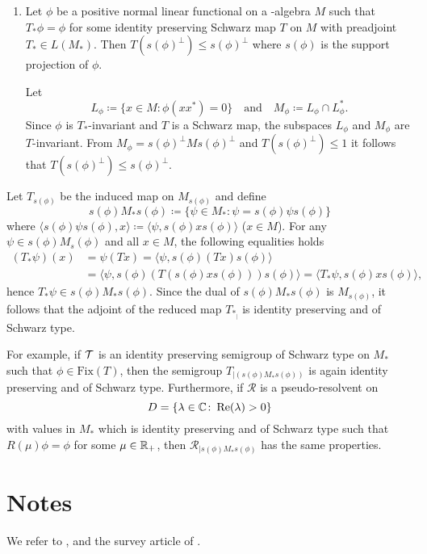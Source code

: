 \begin{enumerate}[1., wide, labelsep=1em, itemindent=\parindent]
\item
Let $ \phi $ be a positive normal linear functional on a \WA-algebra $ M $ such that $ T_{*}\phi = \phi $ for some identity preserving Schwarz map $ T $ on $ M $ with preadjoint $ T_{*} \in L(M_{*}) $.
Then $ T(s(\phi)^{\perp}) \leq s(\phi)^{\perp} $ where $ s(\phi) $ is the support projection of $ \phi $.

Let 
%
\[
	L_\phi \coloneqq \{ x \in M \colon \phi(xx^{*}) = 0 \}
	\quad \text{and} \quad
	M_\phi \coloneqq L_\phi \cap L_\phi^{*} .
\]
%
Since $ \phi $ is $ T_{*} $-invariant and $ T $ is a Schwarz map, the subspaces $ L_{\phi} $ and $ M_{\phi} $ are $ T $-invariant.
From $ M_{\phi} = s(\phi)^{\perp}Ms(\phi)^{\perp} $ and $ T(s(\phi)^{\perp}) \leq 1 $ it follows that $ T(s(\phi)^{\perp}) \leq s(\phi)^{\perp} $.

\end{enumerate}
Let $ T_{s(\phi)} $ be the induced map on $ M_{s(\phi)} $ and define
\[
	s(\phi)M_{*}s(\phi) \coloneqq \{\psi \in M_{*} \colon \psi = s(\phi)\psi s(\phi)\}
\]
where $ \langle s(\phi)\psi s(\phi),x \rangle \coloneqq \langle \psi,s(\phi)xs(\phi) \rangle $ ($ x \in M $).
For any $\psi \in s(\phi)M_s(\phi)$ and all $x \in M$, the following equalities holds
\begin{align*}
(T_{*}\psi)(x) &= \psi(Tx) = \langle \psi,s(\phi)(Tx)s(\phi) \rangle \\
	&= \langle \psi,s(\phi)(T(s(\phi)xs(\phi)))s(\phi) \rangle = \langle T_{*}\psi,s(\phi)xs(\phi) \rangle,
\end{align*}
hence $ T_{*}\psi \in s(\phi)M_{*}s(\phi) $.
Since the dual of $ s(\phi)M_{*}s(\phi) $ is $ M_{s(\phi)} $, it follows that the adjoint of the reduced map $ T_{*_{|}} $ is identity preserving and of Schwarz type.

For example, if $ \mathcal{T} $ is an identity preserving semigroup of Schwarz type on $ M_{*} $ such that $ \phi \in \text{Fix}(T) $, then the semigroup $ T_{\vert (s(\phi)M_{*}s(\phi))} $ is again identity preserving and of Schwarz type.
Furthermore, if  $ \mathcal{R} $ is a pseudo-resolvent on 
%
\[
	D = \{\lambda \in \mathbb{C} \colon \mathop{}\!\mathrm{Re}(\lambda) > 0\} 
\]
%
with values in $ M_{*} $ which is identity preserving and of Schwarz type such that $ R(\mu)\phi = \phi $ for some $ \mu \in \mathbb{R}_{+} $, then $ \mathcal{R}_{\vert s(\phi)M_{*}s(\phi)} $ has the same properties.

\section*{Notes}
We refer to \citet{brattelirobinson:1979}, \citet{davies:1976} and the survey article of \citet{oseledets:1984}.
